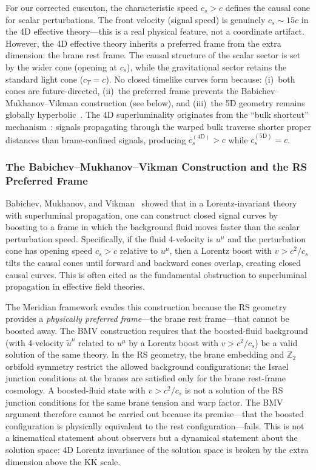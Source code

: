 For our corrected cuscuton, the characteristic speed $c_s > c$ defines the causal cone for scalar perturbations. The front velocity (signal speed) is genuinely $c_s \sim 15c$ in the 4D effective theory---this is a real physical feature, not a coordinate artifact. However, the 4D effective theory inherits a preferred frame from the extra dimension: the brane rest frame. The causal structure of the scalar sector is set by the wider cone (opening at $c_s$), while the gravitational sector retains the standard light cone ($c_T = c$). No closed timelike curves form because: (i)~both cones are future-directed, (ii)~the preferred frame prevents the Babichev--Mukhanov--Vikman construction (see below), and (iii)~the 5D geometry remains globally hyperbolic~\cite{ch5:Babichev2008}. The 4D superluminality originates from the ``bulk shortcut'' mechanism~\cite{ch5:ChungFreese2000}: signals propagating through the warped bulk traverse shorter proper distances than brane-confined signals, producing $c_s^{(4\mathrm{D})} > c$ while $c_s^{(5\mathrm{D})} = c$.

\subsubsection{The Babichev--Mukhanov--Vikman Construction and the RS Preferred Frame}
\label{sec:5-bmv}

Babichev, Mukhanov, and Vikman~\cite{ch5:Babichev2008} showed that in a Lorentz-invariant theory with superluminal propagation, one can construct closed signal curves by boosting to a frame in which the background fluid moves faster than the scalar perturbation speed. Specifically, if the fluid 4-velocity is $u^\mu$ and the perturbation cone has opening speed $c_s > c$ relative to $u^\mu$, then a Lorentz boost with $v > c^2/c_s$ tilts the causal cones until forward and backward cones overlap, creating closed causal curves. This is often cited as the fundamental obstruction to superluminal propagation in effective field theories.

The Meridian framework evades this construction because the RS geometry provides a \emph{physically preferred frame}---the brane rest frame---that cannot be boosted away. The BMV construction requires that the boosted-fluid background (with 4-velocity $\tilde{u}^\mu$ related to $u^\mu$ by a Lorentz boost with $v > c^2/c_s$) be a valid solution of the same theory. In the RS geometry, the brane embedding and $\mathbb{Z}_2$ orbifold symmetry restrict the allowed background configurations: the Israel junction conditions at the branes are satisfied only for the brane rest-frame cosmology. A boosted-fluid state with $v > c^2/c_s$ is not a solution of the RS junction conditions for the same brane tension and warp factor. The BMV argument therefore cannot be carried out because its premise---that the boosted configuration is physically equivalent to the rest configuration---fails. This is not a kinematical statement about observers but a dynamical statement about the solution space: 4D Lorentz invariance of the solution space is broken by the extra dimension above the KK scale.

